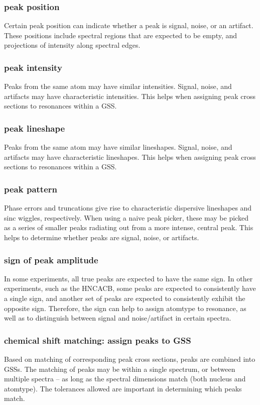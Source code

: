 \subsubsection{peak position}
Certain peak position can indicate whether a peak is signal, noise, or an 
artifact.  These positions include spectral regions that are expected to be 
empty, and projections of intensity along spectral edges.

\subsubsection{peak intensity}
Peaks from the same atom may have similar intensities. 
Signal, noise, and artifacts may have characteristic intensities.
This helps when assigning peak cross sections to resonances within a GSS.

\subsubsection{peak lineshape}
Peaks from the same atom may have similar lineshapes.
Signal, noise, and artifacts may have characteristic lineshapes.
This helps when assigning peak cross sections to resonances within a GSS.
 
\subsubsection{peak pattern}
Phase errors and truncations give rise to characteristic dispersive lineshapes
and sinc wiggles, respectively.  When using a naive peak picker, these may
be picked as a series of smaller peaks radiating out from a more intense,
central peak.  This helps to determine whether peaks are signal, noise, 
or artifacts.

\subsubsection{sign of peak amplitude}
In some experiments, all true peaks are expected to have the same sign.  In
other experiments, such as the HNCACB, some peaks are expected to consistently
have a single sign, and another set of peaks are expected to consistently 
exhibit the opposite sign.  Therefore, the sign can help to assign atomtype
to resonance, as well as to distinguish between signal and noise/artifact
in certain spectra.

\subsubsection{chemical shift matching: assign peaks to GSS}
Based on matching of corresponding peak cross sections, peaks are combined into
GSSs.  The matching of peaks may be within a single spectrum, or between 
multiple spectra -- as long as the spectral dimensions match (both nucleus
and atomtype).  The tolerances allowed are important in determining which
peaks match.

